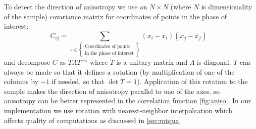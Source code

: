 \documentclass[reprint,amsmath,amssymb,aps,pre,showkeys,showpacs]{revtex4-1}
\begin{document}
To detect the direction of anisotropy we use an $N \times N$ (where $N$ is
dimensionality of the sample) covariance matrix for coordinates of points in the
phase of interest:
\begin{equation}
  C_{ij} = \sum_{x \in \left\{
    \begin{array}{l}
      \text{Coordinates of points} \\
      \text{in the phase of interset}
    \end{array}
    \right\}} (x_i - \overline{x_i})(x_j - \overline{x_j})
\end{equation}
and decompose $C$ as $T \Lambda T^{-1}$ where $T$ is a unitary matrix and
$\Lambda$ is diagonal. $T$ can always be made so that it defines a rotation (by
multiplication of one of the columns by $-1$ if needed, so that
$\det T = 1$). Application of this rotation to the sample makes the direction of
anisotropy parallel to one of the axes, so anisotropy can be better represented in
the correlation function \cref{fig:aniso}. In our implementation we use rotation
with nearest-neighbor interpolcation which affects quality of computations as
discussed in \cref{sec:rotqua}.
\end{document}
